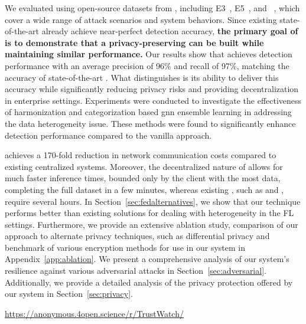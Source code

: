 We evaluated \Sys using open-source datasets from \darpa, including E3~\cite{error3}, E5~\cite{bug5}, and \optc~\cite{anjum2021analyzing}, which cover a wide range of attack scenarios and system behaviors. Since existing state-of-the-art \pids already achieve near-perfect detection accuracy, {\bf the primary goal of \Sys is to demonstrate that a privacy-preserving \pids can be built while maintaining similar performance.} Our results show that \Sys achieves detection performance with an average precision of 96\% and recall of 97\%, matching the accuracy of state-of-the-art \pids. What distinguishes \Sys is its ability to deliver this accuracy while significantly reducing privacy risks and providing decentralization in enterprise settings. Experiments were conducted to investigate the effectiveness of \wordvec harmonization and categorization based gnn ensemble learning in addressing the data heterogeneity issue. These methods were found to significantly enhance detection performance compared to the vanilla approach.


\Sys achieves a 170-fold reduction in network communication costs compared to existing centralized systems. Moreover, the decentralized nature of \Sys allows for much faster inference times, bounded only by the client with the most data, completing the full \optc dataset in a few minutes, whereas existing \pids, such as \flash and \kairos, require several hours. In Section~\ref{sec:fedalternatives}, we show that our technique performs better than existing solutions for dealing with heterogeneity in the FL settings. Furthermore, we provide an extensive ablation study, comparison of our approach to alternate privacy techniques, such as differential privacy and benchmark of various encryption methods for use in our system in Appendix~\ref{app:ablation}. We present a comprehensive analysis of our system's resilience against various adversarial attacks in Section~\ref{sec:adversarial}. Additionally, we provide a detailed analysis of the privacy protection offered by our system in Section~\ref{sec:privacy}.

 \url{https://anonymous.4open.science/r/TrustWatch/}


